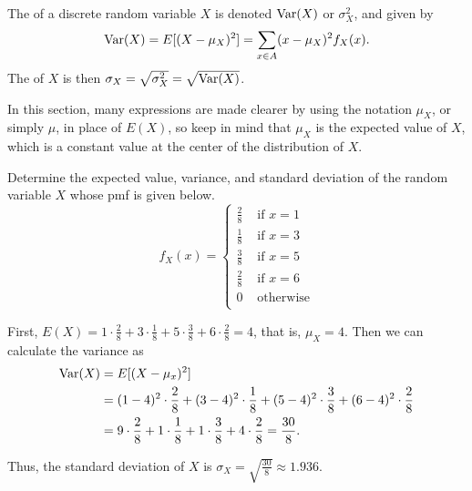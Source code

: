\begin{definition}\label{VarianceDefRV} The  of a discrete random variable $X$ is denoted $\operatorname{Var}(X)$ or $\sigma^{2}_{X}$, and given by 
$$\operatorname{Var}(X) = E[(X - \mu_X)^2] = \sum_{x \in A} (x - \mu_X)^2 f_X(x).$$
The  of $X$ is then $\sigma_X = \sqrt{\sigma^{2}_X} = \sqrt{\operatorname{Var}(X)}$.
\end{definition}

\begin{remark}
In this section, many expressions are made clearer by using the notation $\mu_X$, or simply $\mu$, in place of $E(X)$, so keep in mind that $\mu_X$ is the expected value of $X$, which is a constant value at the center of the distribution of $X$.
\end{remark}

\begin{example} Determine the expected value, variance, and standard deviation of the random variable $X$ whose pmf is given below.
\renewcommand*{\arraystretch}{1.35}
$$f_X(x) = \left\{
\begin{array}{cl}
      \frac{2}{8} & \text{ if \ } x = 1 \\
			\frac{1}{8} & \text{ if \ } x = 3 \\
			\frac{3}{8} & \text{ if \ } x = 5 \\
			\frac{2}{8} & \text{ if \ } x = 6 \\
      0 & \text{ otherwise} \\ \end{array} 
\right.$$
\renewcommand*{\arraystretch}{1}

First, $E(X) = 1 \cdot \frac{2}{8} + 3 \cdot \frac{1}{8} + 5 \cdot \frac{3}{8} + 6 \cdot \frac{2}{8} = 4$, that is, $\mu_X = 4$. Then we can calculate the variance as
$$\begin{aligned}\operatorname{Var}(X)&=E[(X-\mu_x)^2] \\
&=(1-4)^2 \cdot \frac{2}{8} + (3-4)^2 \cdot \frac{1}{8} + (5-4)^2 \cdot \frac{3}{8} + (6-4)^2 \cdot \frac{2}{8} \\
&=9 \cdot \frac{2}{8} + 1 \cdot \frac{1}{8} + 1 \cdot \frac{3}{8} + 4 \cdot \frac{2}{8} = \frac{30}{8}.\end{aligned}$$

Thus, the standard deviation of $X$ is $\sigma_X = \sqrt{\frac{30}{8}} \approx 1.936$.
\end{example}

